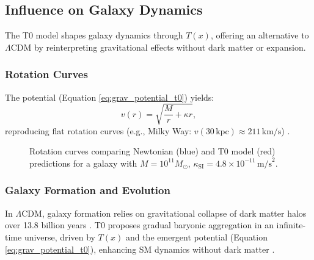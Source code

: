 \documentclass[twocolumn,aps,prl]{revtex4-2}
\newcommand{\Tfield}{T(x)}
\newcommand{\LCDM}{\Lambda\text{CDM}}
\begin{document}
	\subsection{Influence on Galaxy Dynamics}
	\label{subsec:galaxy_dynamics}
	
	The T0 model shapes galaxy dynamics through \(\Tfield\), offering an alternative to \(\LCDM\) by reinterpreting gravitational effects without dark matter or expansion.
	
	\subsubsection{Rotation Curves}
	The potential (Equation \ref{eq:grav_potential_t0}) yields:
	\begin{equation}
		v(r) = \sqrt{\frac{M}{r} + \kappa r},
		\label{eq:rotation_velocity}
	\end{equation}
	reproducing flat rotation curves (e.g., Milky Way: \(v(30 \, \text{kpc}) \approx 211 \, \text{km/s}\)) \cite{pascher_galaxies_2025}.
	
	\begin{figure}[ht]
		\centering
		\caption{Rotation curves comparing Newtonian (blue) and T0 model (red) predictions for a galaxy with \(M = 10^{11} M_{\odot}\), \(\kappa_{\text{SI}} = 4.8 \times 10^{-11} \, \text{m/s}^2\).}
		\label{fig:rotation_curves}
	\end{figure}
	
	\subsubsection{Galaxy Formation and Evolution}
	In \(\LCDM\), galaxy formation relies on gravitational collapse of dark matter halos over 13.8 billion years \cite{Planck2020}. T0 proposes gradual baryonic aggregation in an infinite-time universe, driven by \(\Tfield\) and the emergent potential (Equation \ref{eq:grav_potential_t0}), enhancing SM dynamics without dark matter \cite{pascher_galaxies_2025}.
	
\end{document}
